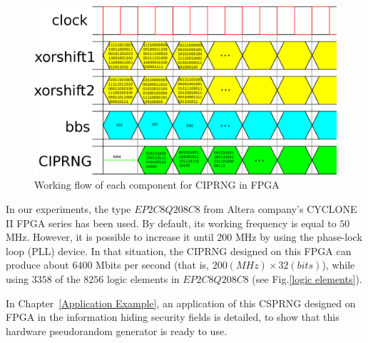 \begin{figure}
\begin{center}
  \includegraphics[width=14cm]{ci_OUTPUT.eps}
\end{center}
\caption{Working flow of each component for CIPRNG in FPGA}
 \label{ci_OUTPUT}
\end{figure}

In our experiments, the type $EP2C8Q208C8$ from Altera 
company's CYCLONE II FPGA series 
has been used. By default, its working
frequency is equal to $50$ MHz.
However, it is possible to increase it until
$200$ MHz by using the phase-lock loop (PLL) device.
In that situation, the CIPRNG designed on this
FPGA can produce about $6400$ Mbits per second
(that is, $200 (MHz) \times 32 (bits)$),
while using $3358$ of the $8256$ logic 
elements in $EP2C8Q208C8$ (see
Fig.\ref{logic elements}). 

In Chapter~\ref{Application Example}, an application of this 
CSPRNG designed on FPGA in the information 
hiding security fields is detailed, to show
that this hardware pseudorandom generator 
is ready to use.
